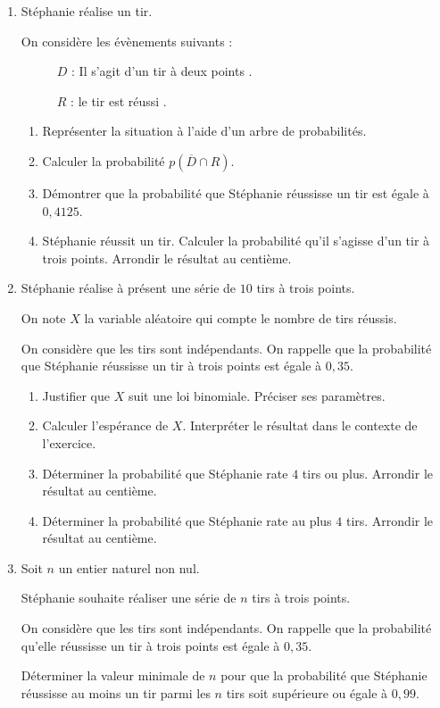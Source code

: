 \begin{enumerate}
\item Stéphanie réalise un tir. 

On considère les évènements suivants :

\begin{description}
\item[ ] $D$ : \og Il s'agit d'un tir à deux points \fg.
\item[ ] $R$ : \og le tir est réussi \fg.
\end{description}
	\begin{enumerate}
		\item Représenter la situation à l'aide d'un arbre de probabilités.
		\item Calculer la probabilité $p\left(\overline{D} \cap R\right)$.
		\item Démontrer que la probabilité que Stéphanie réussisse un tir est égale à $0,4125$.
		\item Stéphanie réussit un tir. Calculer la probabilité qu'il s'agisse d'un tir à trois points. Arrondir le résultat au centième.
	\end{enumerate}	
\item Stéphanie réalise à présent une série de $10$ tirs à trois points.

On note $X$ la variable aléatoire qui compte le nombre de tirs réussis.

On considère que les tirs sont indépendants. On rappelle que la probabilité que Stéphanie réussisse un tir à trois points est égale à $0,35$.
	\begin{enumerate}
		\item Justifier que $X$ suit une loi binomiale. Préciser ses paramètres.
		\item Calculer l'espérance de $X$. Interpréter le résultat dans le contexte de l'exercice.
		\item Déterminer la probabilité que Stéphanie rate $4$ tirs ou plus. Arrondir le résultat au centième.
		\item Déterminer la probabilité que Stéphanie rate au plus $4$ tirs. Arrondir le résultat au centième.
	\end{enumerate}
\item Soit $n$ un entier naturel non nul.

Stéphanie souhaite réaliser une série de $n$ tirs à trois points. 

On considère que les tirs sont indépendants. On rappelle que la probabilité qu'elle réussisse un tir à trois points est égale à $0,35$.

Déterminer la valeur minimale de $n$ pour que la probabilité que Stéphanie réussisse au moins un tir parmi les $n$ tirs soit supérieure ou égale à $0,99$.
\end{enumerate}

\bigskip
